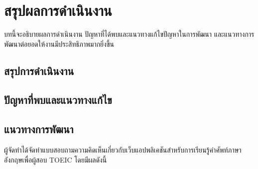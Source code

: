 \documentclass[12pt,oneside,openright,a4paper]{cpe-thai-project}
\begin{document}

\chapter{สรุปผลการดำเนินงาน}
\hspace{1cm}
บทนี้จะอธิบายผลการดำเนินงาน ปัญหาที่ได้พบและแนวทางแก้ไขปัญหาในการพัฒนา และแนวทางการพัฒนาต่อยอดให้งานมีประสิทธิภาพมากยิ่งขึ้น
\section{สรุปการดำเนินงาน}


\section{ปัญหาที่พบและแนวทางแก้ไข}


\section{แนวทางการพัฒนา}





\makeatletter
\g@addto@macro{\UrlBreaks}{\UrlOrds}
\makeatother
% 





ผู้จัดทำได้จัดทำแบบสอบถามความคิดเห็นเกี่ยวกับเว็บแอปพลิเคชันสำหรับการเรียนรู้คำศัพท์ภาษาอังกฤษเพื่อผู้สอบ TOEIC โดยมีผลดังนี้
\end{document}
